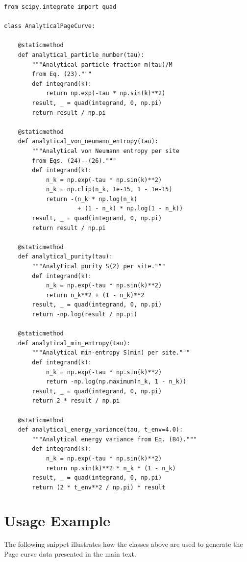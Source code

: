 \documentclass[12pt,oneside,openright]{report}
\theoremstyle{definition}
\theoremstyle{plain}
\theoremstyle{remark}
\begin{document}
\begin{lstlisting}[caption={Analytical Page curve predictions from the disjoint resonant level model.}]
from scipy.integrate import quad

class AnalyticalPageCurve:

    @staticmethod
    def analytical_particle_number(tau):
        """Analytical particle fraction m(tau)/M
        from Eq. (23)."""
        def integrand(k):
            return np.exp(-tau * np.sin(k)**2)
        result, _ = quad(integrand, 0, np.pi)
        return result / np.pi

    @staticmethod
    def analytical_von_neumann_entropy(tau):
        """Analytical von Neumann entropy per site
        from Eqs. (24)--(26)."""
        def integrand(k):
            n_k = np.exp(-tau * np.sin(k)**2)
            n_k = np.clip(n_k, 1e-15, 1 - 1e-15)
            return -(n_k * np.log(n_k)
                     + (1 - n_k) * np.log(1 - n_k))
        result, _ = quad(integrand, 0, np.pi)
        return result / np.pi

    @staticmethod
    def analytical_purity(tau):
        """Analytical purity S(2) per site."""
        def integrand(k):
            n_k = np.exp(-tau * np.sin(k)**2)
            return n_k**2 + (1 - n_k)**2
        result, _ = quad(integrand, 0, np.pi)
        return -np.log(result / np.pi)

    @staticmethod
    def analytical_min_entropy(tau):
        """Analytical min-entropy S(min) per site."""
        def integrand(k):
            n_k = np.exp(-tau * np.sin(k)**2)
            return -np.log(np.maximum(n_k, 1 - n_k))
        result, _ = quad(integrand, 0, np.pi)
        return 2 * result / np.pi

    @staticmethod
    def analytical_energy_variance(tau, t_env=4.0):
        """Analytical energy variance from Eq. (B4)."""
        def integrand(k):
            n_k = np.exp(-tau * np.sin(k)**2)
            return np.sin(k)**2 * n_k * (1 - n_k)
        result, _ = quad(integrand, 0, np.pi)
        return (2 * t_env**2 / np.pi) * result
\end{lstlisting}

\section{Usage Example}
\label{app:code:usage}

The following snippet illustrates how the classes above are used to generate the Page curve data presented in the main text.
\end{document}
